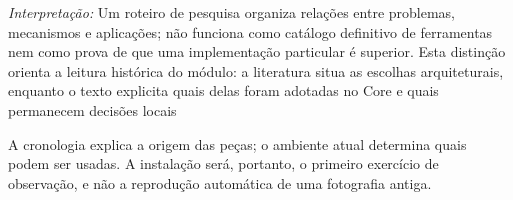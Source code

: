 \noindent\textit{Interpretação:} Um roteiro de pesquisa organiza relações entre problemas, mecanismos e aplicações; não funciona como catálogo definitivo de ferramentas nem como prova de que uma implementação particular é superior. Esta distinção orienta a leitura histórica do módulo: a literatura situa as escolhas arquiteturais, enquanto o texto explicita quais delas foram adotadas no Core e quais permanecem decisões locais 

A cronologia explica a origem das peças; o ambiente atual determina quais podem ser usadas. A instalação será, portanto, o primeiro exercício de observação, e não a reprodução automática de uma fotografia antiga.
